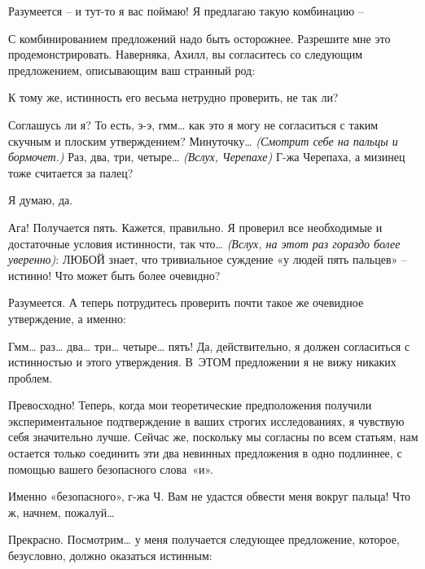 \documentclass[../main.tex]{subfiles}
\begin{document}
\begin{dialogue}
 Разумеется \--- и тут-то я вас поймаю! Я предлагаю такую комбинацию \---

 С комбинированием предложений надо быть осторожнее. Разрешите мне это продемонстрировать. Наверняка, Ахилл, вы согласитесь со следующим предложением, описывающим ваш странный род:


К тому же, истинность его весьма нетрудно проверить, не так ли?

 Соглашусь ли я? То есть, э-э, гмм\ldots{} как это я могу не согласиться с таким скучным и плоским утверждением? Минуточку\ldots{} \emph{(Смотрит себе на пальцы и бормочет.)} Раз, два, три, четыре\ldots{} \emph{(Вслух, Черепахе)} Г-жа Черепаха, а мизинец тоже считается за палец?

 Я думаю, да.

 Ага! Получается пять. Кажется, правильно. Я проверил все необходимые и достаточные условия истинности, так что\ldots{} \emph{(Вслух, на этот раз гораздо более уверенно)}: ЛЮБОЙ знает, что тривиальное суждение «у людей пять пальцев» \--- истинно! Что может быть более очевидно?

 Разумеется. А теперь потрудитесь проверить почти такое же очевидное утверждение, а именно:


 Гмм\ldots{} раз\ldots{} два\ldots{} три\ldots{} четыре\ldots{} пять! Да, действительно, я должен согласиться с истинностью и этого утверждения. В~ЭТОМ предложении я не вижу никаких проблем.

 Превосходно! Теперь, когда мои теоретические предположения получили экспериментальное подтверждение в ваших строгих исследованиях, я чувствую себя значительно лучше. Сейчас же, поскольку мы согласны по всем статьям, нам остается только соединить эти два невинных предложения в одно подлиннее, с помощью вашего безопасного слова~«и».

 Именно «безопасного», г-жа Ч\@. Вам не удастся обвести меня вокруг пальца! Что ж, начнем, пожалуй\ldots{}

 Прекрасно. Посмотрим\ldots{} у меня получается следующее предложение, которое, безусловно, должно оказаться истинным:



\end{dialogue}
\end{document}
